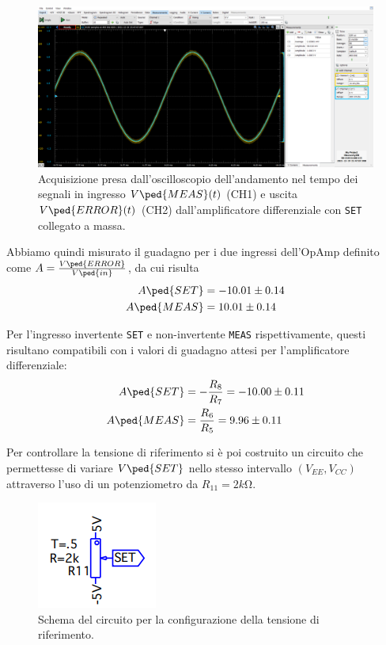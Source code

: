 \documentclass[10pt, a4paper, italian]{article}
\begin{document}
\begin{figure}[htbp]
    \centering
	\includegraphics[width=\textwidth]{error.meas}
    \caption{Acquisizione presa dall'oscilloscopio dell'andamento nel tempo dei
	segnali in ingresso $V\ped{MEAS} (t)$ (CH1) e uscita $V\ped{ERROR} (t)$ (CH2)
	dall'amplificatore differenziale con \texttt{SET} collegato a massa.
    \label{fig: errmeas}}
\end{figure}

Abbiamo quindi misurato il guadagno per i due ingressi dell'OpAmp definito
come $A = \frac{V\ped{ERROR}}{V\ped{in}}$, da cui risulta
\begin{align*}
A\ped{SET} &= -10.01 \pm 0.14 \\
A\ped{MEAS} &= 10.01 \pm 0.14
\end{align*}

Per l'ingresso invertente \verb+SET+ e non-invertente \verb+MEAS+
rispettivamente, questi risultano compatibili con i valori di guadagno attesi
per l'amplificatore differenziale:
\begin{align*}
A\ped{SET} &= - \frac{R_8}{R_7} = -10.00 \pm 0.11 \\
A\ped{MEAS} &= \frac{R_6}{R_5} = 9.96 \pm 0.11
\end{align*}

Per controllare la tensione di riferimento si è poi costruito un circuito che
permettesse di variare $V\ped{SET}$ nello stesso intervallo
$(V_{EE}, V_{CC})$ attraverso l'uso di un potenziometro da
$R_{11} = 2 \si{k\ohm}$.
\begin{figure}[htbp]
    \centering
	\includegraphics[scale=0.7]{setgen}
    \caption{Schema del circuito per la configurazione della tensione di
    riferimento.
    \label{schm: setgen}}
\end{figure}
\end{document}
